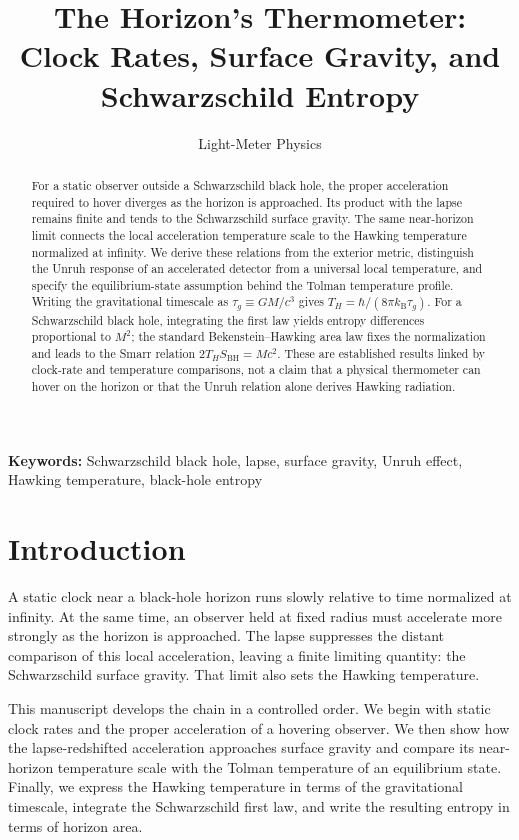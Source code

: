 \documentclass[12pt]{article}
\title{The Horizon's Thermometer:\\
Clock Rates, Surface Gravity, and Schwarzschild Entropy}
\author{Light-Meter Physics}
\date{}
\begin{document}
\maketitle

\begin{abstract}
For a static observer outside a Schwarzschild black hole, the proper acceleration required to hover diverges as the horizon is approached. Its product with the lapse remains finite and tends to the Schwarzschild surface gravity. The same near-horizon limit connects the local acceleration temperature scale to the Hawking temperature normalized at infinity. We derive these relations from the exterior metric, distinguish the Unruh response of an accelerated detector from a universal local temperature, and specify the equilibrium-state assumption behind the Tolman temperature profile. Writing the gravitational timescale as $\tau_g\equiv GM/c^3$ gives $T_H=\hbar/(8\pi k_{\mathrm B}\tau_g)$. For a Schwarzschild black hole, integrating the first law yields entropy differences proportional to $M^2$; the standard Bekenstein--Hawking area law fixes the normalization and leads to the Smarr relation $2T_HS_{\mathrm{BH}}=Mc^2$. These are established results linked by clock-rate and temperature comparisons, not a claim that a physical thermometer can hover on the horizon or that the Unruh relation alone derives Hawking radiation.
\end{abstract}

\noindent\textbf{Keywords:} Schwarzschild black hole, lapse, surface gravity, Unruh effect, Hawking temperature, black-hole entropy

\section{Introduction}

A static clock near a black-hole horizon runs slowly relative to time normalized at infinity. At the same time, an observer held at fixed radius must accelerate more strongly as the horizon is approached. The lapse suppresses the distant comparison of this local acceleration, leaving a finite limiting quantity: the Schwarzschild surface gravity. That limit also sets the Hawking temperature.

This manuscript develops the chain in a controlled order. We begin with static clock rates and the proper acceleration of a hovering observer. We then show how the lapse-redshifted acceleration approaches surface gravity and compare its near-horizon temperature scale with the Tolman temperature of an equilibrium state. Finally, we express the Hawking temperature in terms of the gravitational timescale, integrate the Schwarzschild first law, and write the resulting entropy in terms of horizon area.
\end{document}

